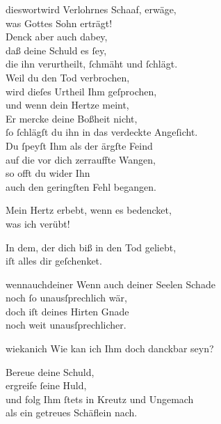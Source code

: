 \documentclass[tocstyle=ref-genre]{ees}
\begin{document}
{\begin{movement}{dieswortwird}
  Verlohrnes Schaaf, erwäge,\\
  was Gottes Sohn erträgt!\\
  Denck aber auch dabey,\\
  daß deine Schuld es ſey,\\
  die ihn verurtheilt, ſchmäht und ſchlägt.\\
  Weil du den Tod verbrochen,\\
  wird dieſes Urtheil Ihm geſprochen,\\
  und wenn dein Hertze meint,\\
  Er mercke deine Boßheit nicht,\\
  ſo ſchlägſt du ihn in das verdeckte Angeſicht.\\
  Du ſpeyſt Ihm als der ärgſte Feind\\
  auf die vor dich zerrauffte Wangen,\\
  so offt du wider Ihn\\
  auch den geringſten Fehl begangen.

  Mein Hertz erbebt, wenn es bedencket,\\
  was ich verübt!

  In dem, der dich biß in den Tod geliebt,\\
  iſt alles dir geſchenket.
\end{movement}

\begin{movement}{wennauchdeiner}
  Wenn auch deiner Seelen Schade\\
  noch ſo unausſprechlich wär,\\
  doch iſt deines Hirten Gnade\\
  noch weit unausſprechlicher.
\end{movement}

\clearpage
\begin{movement}{wiekanich}
  Wie kan ich Ihm doch danckbar seyn?

  Bereue deine Schuld,\\
  ergreife ſeine Huld,\\
  und folg Ihm ſtets in Kreutz und Ungemach\\
  als ein getreues Schäflein nach.
\end{movement}

}
\end{document}
